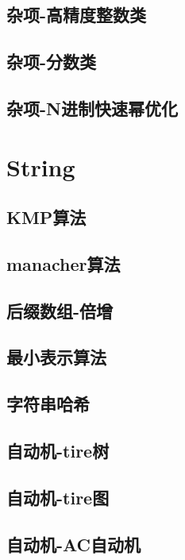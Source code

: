 \documentclass[UTF8]{ctexart}
\begin{document}
\begin{CJK}{UTF8}{<font>}
\begin{spacing}{0.80}
\subsection{杂项-高精度整数类} 
\subsection{杂项-分数类} 
\subsection{杂项-N进制快速幂优化} 
\section{String}
\subsection{KMP算法} 
\subsection{manacher算法} 
\subsection{后缀数组-倍增} 
\subsection{最小表示算法} 
\subsection{字符串哈希} 
\subsection{自动机-tire树} 
\subsection{自动机-tire图} 
\subsection{自动机-AC自动机} 

\end{spacing}
\end{CJK}
\end{document}
